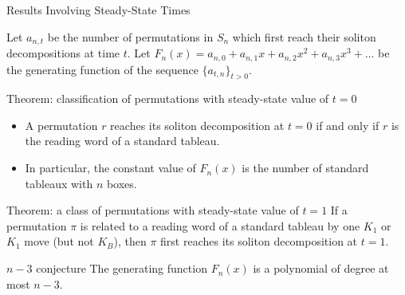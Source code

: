 \documentclass[aspectratio=169, serif]{beamer}
\begin{document}
\begin{frame}{Results Involving Steady-State Times}

    Let $a_{n,t}$ be the number of permutations in $S_n$ which first reach their soliton decompositions at  time $t$. Let $F_n(x)=a_{n,0} + a_{n,1} x + a_{n,2} x^2 + a_{n,3} x^3 + \dots $ be the generating function of the sequence $\{a_{t,n}\}_{t > 0}$.

    \begin{alertblock}{Theorem: classification of permutations with steady-state value of $t=0$}
\begin{itemize}
    \item 
   A permutation $r$ reaches its soliton decomposition at $t=0$ if and only if $r$ is the reading word of a standard tableau. 
   \item 
   In particular, the constant value of $F_n(x)$ is the number of standard tableaux with $n$ boxes. 
   \end{itemize}
    \end{alertblock}
    \begin{alertblock}{Theorem: a class of permutations with steady-state value of $t=1$}
    If a permutation $\pi$ is related to a reading word of a standard tableau by one $K_1$ or $K_1$ move (but not $K_B$), then $\pi$ first reaches its soliton decomposition at $t=1$.
    
    \end{alertblock}
    

    \begin{block}{$n-3$ conjecture}
    The generating function  $F_n(x)$ is a polynomial of degree at most $n-3$. 
    
    \end{block}
\end{frame}
\end{document}
